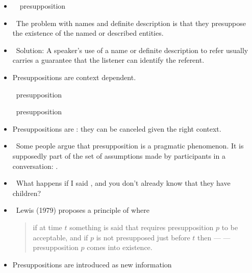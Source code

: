 \documentclass[headrule,footrule]{foils}
\begin{document}
\begin{itemize}
\item 
  \begin{exe}
  \ex  
  \ex   \hfill presupposition
\end{exe}
\item  The problem with names and definite description is that they
presuppose the existence of the named or described entities.
\item  Solution: A speaker’s use of a name or
definite description to refer usually carries a guarantee that the
listener can identify the referent.
\end{itemize}


\begin{itemize}
\item  Presuppositions are context dependent. 
\begin{exe}
    \ex \begin{xlist}
      \ex {}
      \ex   \hfill presupposition
    \end{xlist}
 \ex \begin{xlist}
   \ex {}
   \ex   \hfill presupposition
 \end{xlist}
\end{exe}
\item Presuppositions are : they can be canceled
  given the right context.

\end{itemize}

\begin{itemize}
\item  Some people argue that presupposition is a pragmatic
phenomenon. It is supposedly part of the set of assumptions
made by participants in a conversation: .
\item  What happens if I said , and you don’t
already know that they have children?
\item  Lewis (1979) proposes a principle of  where 
  \begin{quote}
    if at time $t$ something is said that requires presupposition $p$ to
    be acceptable, and if $p$ is not presupposed just before $t$ then
    ---  --- presupposition $p$ comes into existence.
\end{quote}
\item Presuppositions are introduced as new information
\end{itemize}
\end{document}
